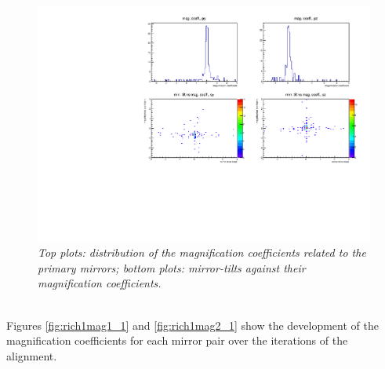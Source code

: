 \begin{figure}[!ht]
	\vspace*{-0.cm}
	\begin{center}
		\includegraphics[width=1.\textwidth]{2dplot_rich1_1.pdf}
		\vspace*{-1.5cm}
	\end{center}
	\caption{\textit{Top plots: distribution of the magnification coefficients related to the primary mirrors; bottom plots: mirror-tilts against their magnification coefficients.}}
	\label{fig:rich12d_1}
\end{figure}
\\
Figures \ref{fig:rich1mag1_1} and \ref{fig:rich1mag2_1} show the development of the magnification coefficients for each mirror pair over the iterations of the alignment.\\
